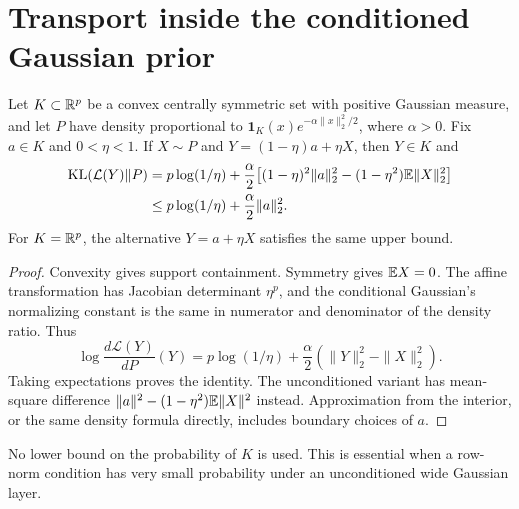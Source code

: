 \section{Transport inside the conditioned Gaussian prior}
\begin{lemma}
\label{lem:transport}
Let $K\subset\mathbb R^p$ be a convex centrally symmetric set with positive Gaussian measure, and let $P$ have density proportional to $\mathbf1_K(x)e^{-\alpha\|x\|_2^2/2}$, where $\alpha>0$. Fix $a\in K$ and $0<\eta<1$. If $X\sim P$ and $Y=(1-\eta)a+\eta X$, then $Y\in K$ and
\begin{align}
 \operatorname{KL}(\mathcal L(Y)\|P)
 &=p\log(1/\eta)+\frac\alpha2\bigl[(1-\eta)^2\|a\|_2^2-(1-\eta^2)\mathbb E\|X\|_2^2\bigr]\notag\\
 &\le p\log(1/\eta)+\frac\alpha2\|a\|_2^2.
 \label{eq:transport}
\end{align}
For $K=\mathbb R^p$, the alternative $Y=a+\eta X$ satisfies the same upper bound.
\end{lemma}
\begin{proof}
Convexity gives support containment. Symmetry gives $\mathbb E X=0$. The affine transformation has Jacobian determinant $\eta^p$, and the conditional Gaussian's normalizing constant is the same in numerator and denominator of the density ratio. Thus
\[
 \log\frac{d\mathcal L(Y)}{dP}(Y)
 =p\log(1/\eta)+\frac\alpha2(\|Y\|_2^2-\|X\|_2^2).
\]
Taking expectations proves the identity. The unconditioned variant has mean-square difference $\|a\|^2-(1-\eta^2)\mathbb E\|X\|^2$ instead. Approximation from the interior, or the same density formula directly, includes boundary choices of $a$.
\end{proof}

No lower bound on the probability of $K$ is used. This is essential when a row-norm condition has very small probability under an unconditioned wide Gaussian layer.

